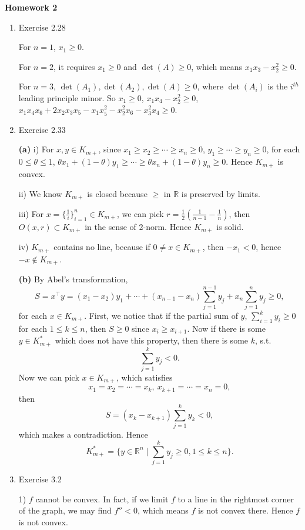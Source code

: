 \documentclass{article}%
\begin{document}
\begin{center}
\textbf{Homework 2}\bigskip
\end{center}
\begin{enumerate}
\item Exercise 2.28

For $n = 1$, $x_1 \ge 0 $.

For $n = 2$, it requires $x_1 \ge 0  $ and $\det(A) \ge 0$, which means $x_1x_3-x_2^2 \ge 0 $.

For $n = 3$, $\det(A_1), \det(A_2), \det(A) \ge 0$, where $\det(A_i)$ is the $i^{th} $ leading principle minor. So $x_1 \ge 0 $, $x_1x_4-x_2^2 \ge 0 $, $x_1x_4x_6+2x_2x_3x_5-x_1x_5^2-x_2^2x_6-x_3^2x_4 \ge 0 $.

\item Exercise 2.33

\textbf{(a)} 
i) For $x, y\in K_{m+} $, since $x_1\ge x_2\ge \cdots \ge x_n\ge 0 $, $y_1\ge \cdots\ge y_n \ge 0 $, for each $0 \le \theta \le 1$, $\theta x_1 + (1-\theta) y_1 \ge \cdots\ge \theta x_n + (1-\theta)y_n\ge 0 $. Hence $K_{m+} $ is convex.

ii) We know $K_{m+} $ is closed because $\ge$ in $\mathbb{R}$ is preserved by limits.

iii) For $x = \{\frac{1}{i}\}_{i=1}^{n} \in K_{m+} $, we can pick $r = \frac{1}{2}(\frac{1}{n-1}-\frac{1}{n})$, then $O(x, r) \subset K_{m+} $ in the sense of 2-norm. Hence $K_{m+} $ is solid.

iv) $K_{m+} $ contains no line, because if $0\ne x\in K_{m+} $, then $-x_1 < 0 $, hence $-x\notin K_{m+} $.

\textbf{(b)} 
By Abel's transformation,
$$
S = x^\top y = (x_1-x_2)y_1 + \cdots + (x_{n-1}-x_n)\sum_{j=1}^{n-1}y_j + x_n\sum_{j=1}^{n}y_j\ge 0,
$$
for each $x\in K_{m+} $. First, we notice that if the partial sum of $y$, $\sum_{i=1}^{k}y_i\ge 0 $ for each $1\le k \le n$, then $S \ge 0$ since $x_i\ge x_{i+1} $. Now if there is some $y\in K_{m+}^* $ which does not have this property, then there is some $k$, s.t. 
$$
\sum_{j=1}^{k}y_j < 0.
$$
Now we can pick $x\in K_{m+} $, which satisfies 
$$
x_1 = x_2 = \cdots = x_k, ~ x_{k+1} = \cdots = x_n = 0,
$$
then
$$
S = (x_k-x_{k+1})\sum_{j=1}^{k}y_k < 0, 
$$
which makes a contradiction. Hence
$$
K_{m+}^* = \{y\in\mathbb{R}^n\mid \sum_{j=1}^{k} y_j \ge 0, 1\le k \le n\}.
$$

\item Exercise 3.2

1) $f$ cannot be convex. In fact, if we limit $f$ to a line in the rightmost corner of the graph, we may find $f'' < 0$, which means $f$ is not convex there. Hence $f$ is not convex.


\end{enumerate}
\end{document}
